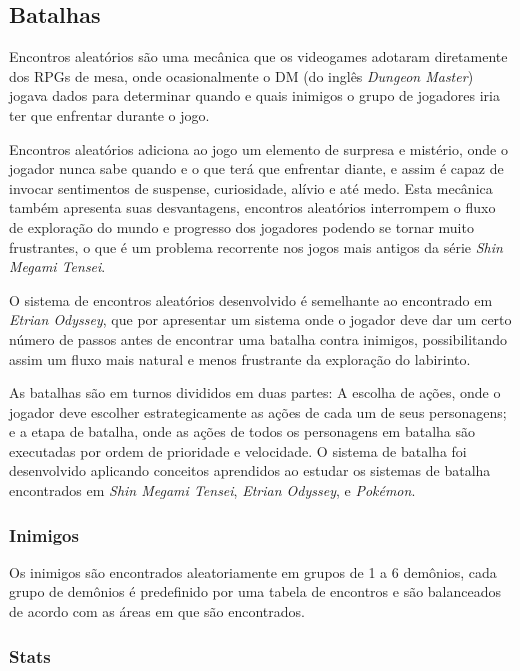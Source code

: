 \documentclass[
	12pt,				%
	openright,			%
	twoside,			%
	a4paper,			%
	english,			%
	french,				%
	spanish,			%
	brazil				%
	]{abntex2}
\begin{document}
\subsection{Batalhas}

Encontros aleatórios são uma mecânica que os videogames adotaram diretamente dos RPGs de mesa, onde ocasionalmente o DM (do inglês \emph{Dungeon Master}) jogava dados para determinar quando e quais inimigos o grupo de jogadores iria ter que enfrentar durante o jogo.

	Encontros aleatórios adiciona ao jogo um elemento de surpresa e mistério, onde o jogador nunca sabe quando e o que terá que enfrentar diante, e assim é capaz de invocar sentimentos de suspense, curiosidade, alívio e até medo. Esta mecânica também apresenta suas desvantagens, encontros aleatórios interrompem o fluxo de exploração do mundo e progresso dos jogadores podendo se tornar muito frustrantes, o que é um problema recorrente nos jogos mais antigos da série \emph{Shin Megami Tensei}. 

	O sistema de encontros aleatórios desenvolvido é semelhante ao encontrado em \emph{Etrian Odyssey}, que por apresentar um sistema onde o jogador deve dar um certo número de passos antes de encontrar uma batalha contra inimigos, possibilitando assim um fluxo mais natural e menos frustrante da exploração do labirinto. 

	As batalhas são em turnos divididos em duas partes: A escolha de ações, onde o jogador deve escolher estrategicamente as ações de cada um de seus personagens; e a etapa de batalha, onde as ações de todos os personagens em batalha são executadas por ordem de prioridade e velocidade. O sistema de batalha foi desenvolvido aplicando conceitos aprendidos ao estudar os sistemas de batalha encontrados em \emph{Shin Megami Tensei}, \emph{Etrian Odyssey}, e \emph{Pokémon}.

\subsubsection{Inimigos}

Os inimigos são encontrados aleatoriamente em grupos de 1 a 6 demônios, cada grupo de demônios é predefinido por uma tabela de encontros e são balanceados de acordo com as áreas em que são encontrados.

\subsubsection{Stats}
\end{document}
